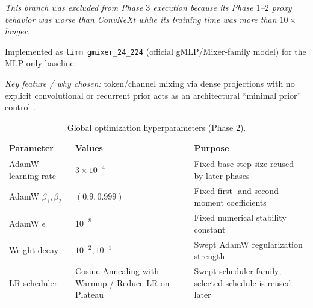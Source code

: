 \documentclass[cameraready]{Interspeech}
\begin{document}
\begin{description}
    \textit{This branch was excluded from Phase $3$ execution because its Phase $1$--$2$ proxy behavior was worse than ConvNeXt while its training time was more than $10\times$ longer.}

    \item[MLP-Mixer:] Implemented as \texttt{timm gmixer\_24\_224} (official gMLP/Mixer-family model) for the MLP-only baseline.

    \textit{Key feature / why chosen:} token/channel mixing via dense projections with no explicit convolutional or recurrent prior acts as an architectural ``minimal prior'' control \cite{tolstikhin2021mlpmixer}.
\end{description}

\begin{table}[h]
\centering
\caption{Global optimization hyperparameters (Phase $2$).}
\label{tab:global_hyperparams}
\small
\begin{tabularx}{\columnwidth}{@{}p{2cm} @{}>{\centering\arraybackslash}p{2.8cm} X@{}}
\toprule
\textbf{Parameter} & \textbf{Values} & \textbf{Purpose} \\ \midrule
AdamW learning rate & $3 \times 10^{-4}$ & Fixed base step size reused by later phases \\
AdamW $\beta_1, \beta_2$ & $(0.9, 0.999)$ & Fixed first- and second-moment coefficients \\
AdamW $\epsilon$ & $10^{-8}$ & Fixed numerical stability constant \\
Weight decay & $10^{-2}, 10^{-1}$ & Swept AdamW regularization strength \\
LR scheduler & Cosine Annealing with Warmup / Reduce LR on Plateau & Swept scheduler family; selected schedule is reused later \\
\bottomrule
\end{tabularx}
\end{table}
\end{document}
